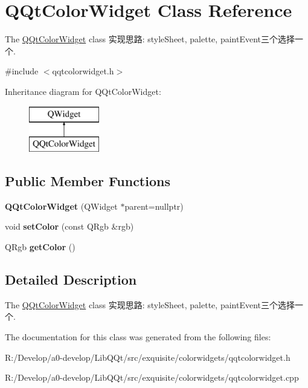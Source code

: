 \hypertarget{class_q_qt_color_widget}{}\section{Q\+Qt\+Color\+Widget Class Reference}
\label{class_q_qt_color_widget}


The \mbox{\hyperlink{class_q_qt_color_widget}{Q\+Qt\+Color\+Widget}} class 实现思路\+: style\+Sheet, palette, paint\+Event三个选择一个.  




{\ttfamily \#include $<$qqtcolorwidget.\+h$>$}

Inheritance diagram for Q\+Qt\+Color\+Widget\+:\begin{figure}[H]
\begin{center}
\leavevmode
\includegraphics[height=2.000000cm]{class_q_qt_color_widget}
\end{center}
\end{figure}
\subsection*{Public Member Functions}
\begin{DoxyCompactItemize}
\item 
\mbox{\label{class_q_qt_color_widget_ae87b67b33dd167436633a346459acc34}} 
{\bfseries Q\+Qt\+Color\+Widget} (Q\+Widget $\ast$parent=nullptr)
\item 
\mbox{\label{class_q_qt_color_widget_afc7419371d80fe81686abfb35af98c93}} 
void {\bfseries set\+Color} (const Q\+Rgb \&rgb)
\item 
\mbox{\label{class_q_qt_color_widget_a1e1d8ab976ad2e28ef1bd4491f756d00}} 
Q\+Rgb {\bfseries get\+Color} ()
\end{DoxyCompactItemize}


\subsection{Detailed Description}
The \mbox{\hyperlink{class_q_qt_color_widget}{Q\+Qt\+Color\+Widget}} class 实现思路\+: style\+Sheet, palette, paint\+Event三个选择一个. 

The documentation for this class was generated from the following files\+:\begin{DoxyCompactItemize}
\item 
R\+:/\+Develop/a0-\/develop/\+Lib\+Q\+Qt/src/exquisite/colorwidgets/qqtcolorwidget.\+h\item 
R\+:/\+Develop/a0-\/develop/\+Lib\+Q\+Qt/src/exquisite/colorwidgets/qqtcolorwidget.\+cpp\end{DoxyCompactItemize}
